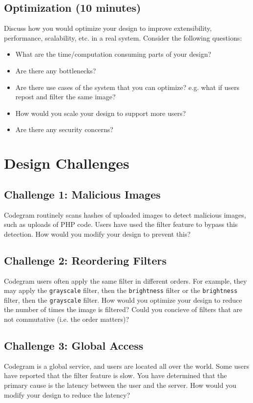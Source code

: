 \documentclass{csse4400}
\begin{document}
\subsection*{Optimization (10 minutes)}
Discuss how you would optimize your design to improve extensibility, performance, scalability, etc. in a real system.
Consider the following questions:
\begin{itemize}
    \item What are the time/computation consuming parts of your design?
    \item Are there any bottlenecks?
    \item Are there use cases of the system that you can optimize? e.g. what if users repost and filter the same image?
    \item How would you scale your design to support more users?
    \item Are there any security concerns?
\end{itemize}

\section{Design Challenges}

\subsection*{Challenge 1: Malicious Images}
Codegram routinely scans hashes of uploaded images to detect malicious images, such as uploads of PHP code.
Users have used the filter feature to bypass this detection.
How would you modify your design to prevent this?

\subsection*{Challenge 2: Reordering Filters}
Codegram users often apply the same filter in different orders.
For example, they may apply the \texttt{grayscale} filter, then the \texttt{brightness} filter or the \texttt{brightness} filter, then the \texttt{grayscale} filter.
How would you optimize your design to reduce the number of times the image is filtered?
Could you concieve of filters that are not commutative (i.e. the order matters)?

\subsection*{Challenge 3: Global Access}
Codegram is a global service, and users are located all over the world.
Some users have reported that the filter feature is slow.
You have determined that the primary cause is the latency between the user and the server.
How would you modify your design to reduce the latency?
\end{document}
